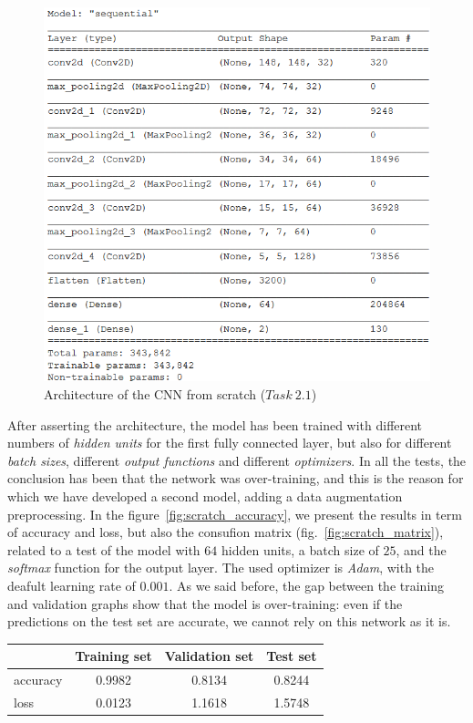 \documentclass[11pt,a4paper,oneside]{article}
\begin{document}
\begin{figure}[h]
\centering
\includegraphics[width=.5\textwidth]{images/scratch_model}
\caption{Architecture of the CNN from scratch ($Task\ 2.1$)}
\label{fig:scratch_model}
\end{figure}

After asserting the architecture, the model has been trained with different numbers of \textit{hidden units} for the first fully connected layer, but also for different \textit{batch sizes}, different \textit{output functions} and different \textit{optimizers}. 
In all the tests, the conclusion has been that the network was over-training, and this is the reason for which we have developed a second model, adding a data augmentation preprocessing. 
In the figure~\ref{fig:scratch_accuracy}, we present the results in term of accuracy and loss, but also the consufion matrix (fig.~\ref{fig:scratch_matrix}), related to a test of the model with $64$ hidden units, a batch size of $25$, and the \textit{softmax} function for the output layer. 
The used optimizer is \textit{Adam}, with the deafult learning rate of $0.001$. As we said before, the gap between the training and validation graphs show that the model is over-training: even if the predictions on the test set are accurate, we cannot rely on this network as it is.\\

\begin{center}
\begin{tabular}{|l|ccc|}
\hline
 & Training set & Validation set & Test set \\
\hline
accuracy & 0.9982 & 0.8134 & 0.8244 \\
loss & 0.0123 & 1.1618 & 1.5748 \\
\hline
\end{tabular}
\end{center}
\end{document}

